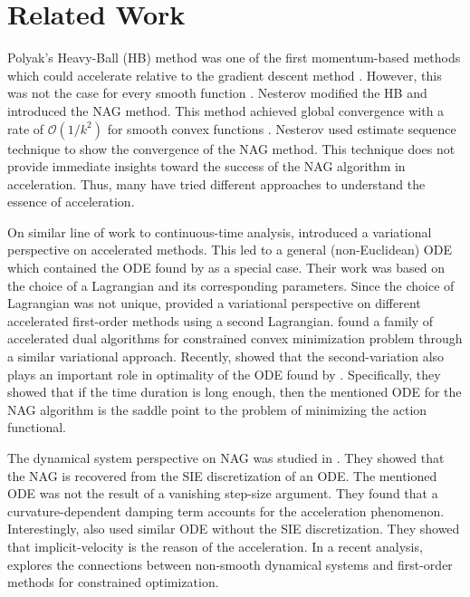 \documentclass{article}
\theoremstyle{plain}
\theoremstyle{definition}
\theoremstyle{remark}
\begin{document}
\section{Related Work}\label{sec_relwork}
Polyak's Heavy-Ball (HB) method was one of the first momentum-based methods which could accelerate relative to the gradient descent method \citep{Polyak1963GradientMF}. However, this was not the case for every smooth function \citep{Lessard2016AnalysisAD}. Nesterov modified the HB and introduced the NAG method. This method achieved global convergence with a rate of $\mathcal{O}(1/k^2)$ for smooth convex functions \citep{Nesterov1983AMF}. Nesterov used estimate sequence technique to show the convergence of the NAG method. This technique does not provide immediate insights toward the success of the NAG algorithm in acceleration. Thus, many have tried different approaches to understand the essence of acceleration. \par
On similar line of work to continuous-time analysis, \citep{WibisonoE7351} introduced a variational perspective on accelerated methods. This led to a general (non-Euclidean) ODE which contained the ODE found by \citep{JMLR:v17:15-084} as a special case. Their work was based on the choice of a Lagrangian and its corresponding parameters. Since the choice of Lagrangian was not unique, \citep{wilson2021lyapunov} provided a variational perspective on different accelerated first-order methods using a second Lagrangian. \citep{7963773} found a family of accelerated dual algorithms for constrained convex minimization problem through a similar variational approach. Recently, \citep{zhang2021rethinking} showed that the second-variation also plays an important role in optimality of the ODE found by \citep{JMLR:v17:15-084}. Specifically, they showed that if the time duration is long enough, then the mentioned ODE for the NAG algorithm is the saddle point to the problem of minimizing the action functional. \par
The dynamical system perspective on NAG was studied in \citep{muehlebach2019dynamical}. They showed that the NAG is recovered from the SIE discretization of an ODE. The mentioned ODE was not the result of a vanishing step-size argument. They found that a curvature-dependent damping term accounts for the acceleration phenomenon. Interestingly, \citep{chen2022gradient} also used similar ODE without the SIE discretization. They showed that implicit-velocity is the reason of the acceleration. In a recent analysis, \citep{muehlebach2023accelerated} explores the connections between non-smooth dynamical systems and first-order methods for constrained optimization.
\end{document}
